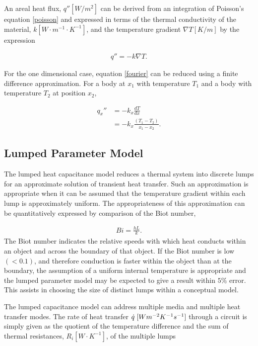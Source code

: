 An areal heat flux, $q'' [W/m^{2}]$ can be derived from an integration of  
Poisson's equation \eqref{poisson}  and expressed in terms of the thermal 
conductivity of the material, $k  [W\cdot m^{-1}\cdot K^{-1}]$,  and the
temperature gradient $\nabla T [K/m]$ by the expression

\begin{align}
  q''= -k\nabla T.
  \label{fourier}
\end{align}

For the one dimensional case, equation \ref{fourier} can be reduced using a 
finite difference approximation. For a body at $x_1$ with temperature $T_1$
and a body with temperature $T_2$ at position $x_2$,

\begin{align}
  q_x'' &= -k_x\frac{dT}{dx}\\
  &=-k_x\frac{(T_1-T_2)}{x_1-x_2}.
\end{align}

\subsection{Lumped Parameter Model}
\label{sec:lumpedparam}

The lumped heat capacitance model reduces a thermal system into discrete lumps 
for an approximate solution of transient heat transfer. Such an approximation is 
appropriate when it can be assumed that the temperature gradient within each 
lump is approximately uniform. The appropriateness of this approximation can be 
quantitatively expressed by comparison of the Biot number, 

\begin{align}
  Bi = \frac{hL}{k}.
  \label{biot}
\end{align}
The Biot number indicates the relative speeds with which heat conducts within an object and 
across the boundary of that object. If the Biot number is low $(<0.1)$, and 
therefore conduction is faster within the object than at the boundary, the 
assumption of a uniform internal temperature is appropriate and the lumped 
parameter model may be expected to give a result within $5\%$ 
error\cite{incropera_fundamentals_2006}. This assists in choosing the size of 
distinct lumps within a conceptual model. 

The lumped capacitance model can address multiple media and multiple heat
transfer modes. The rate of heat transfer $\dot{q}\hspace{1mm}[Wm^{-2}K^{-1}s^{-1}]$ 
through a circuit is simply given as the quotient of the temperature 
difference and the sum of thermal resistances, $R_i [W\cdot K^{-1}]$,
of the multiple lumps 

